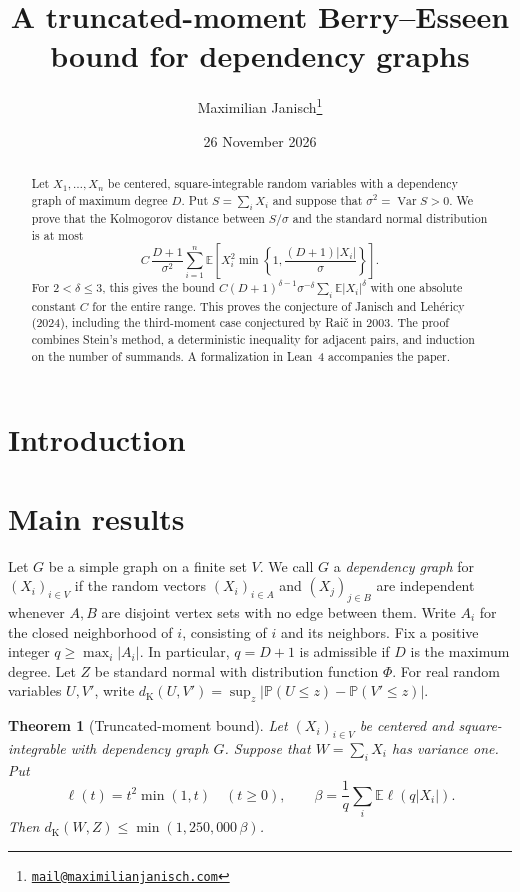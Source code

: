 \documentclass[11pt,a4paper]{article}
\title{A truncated-moment Berry--Esseen bound for dependency graphs}
\author{Maximilian Janisch\thanks{\href{mailto:mail@maximilianjanisch.com}{\nolinkurl{mail@maximilianjanisch.com}}}}
\date{26 November 2026}
\newtheorem{theorem}{Theorem}
\newcommand{\E}{\mathbb E}
\newcommand{\PP}{\mathbb P}
\newcommand{\Var}{\operatorname{Var}}
\newcommand{\dK}{d_{\mathrm K}}
\begin{document}
\maketitle

\begin{abstract}
Let $X_1,\ldots,X_n$ be centered, square-integrable random variables with
a dependency graph of maximum degree $D$. Put $S=\sum_i X_i$ and suppose
that $\sigma^2=\Var S>0$. We prove that the Kolmogorov distance between
$S/\sigma$ and the standard normal distribution is at most
\[
 C\,\frac{D+1}{\sigma^2}\sum_{i=1}^n
 \E\!\left[X_i^2\min\!\left\{1,\frac{(D+1)|X_i|}{\sigma}\right\}\right].
\]
For $2<\delta\le3$, this gives the bound
$C(D+1)^{\delta-1}\sigma^{-\delta}\sum_i\E|X_i|^\delta$ with one
absolute constant $C$ for the entire range. This proves the conjecture of
Janisch and Lehéricy (2024), including the third-moment case conjectured
by Raič in 2003. The proof combines Stein's method, a deterministic
inequality for adjacent pairs, and induction on the number of summands.
A formalization in Lean~4 accompanies the paper.
\end{abstract}

\section{Introduction}


\section{Main results}\label{sec:results}
Let $G$ be a simple graph on a finite set $V$. We call $G$ a
\emph{dependency graph} for $(X_i)_{i\in V}$ if the random vectors
$(X_i)_{i\in A}$ and $(X_j)_{j\in B}$ are independent whenever $A,B$
are disjoint vertex sets with no edge between them. Write $A_i$ for the
closed neighborhood of $i$, consisting of $i$ and its neighbors.
Fix a positive integer $q\ge\max_i|A_i|$. In particular, $q=D+1$ is
admissible if $D$ is the maximum degree. Let $Z$ be standard normal
with distribution function $\Phi$. For real random variables $U,V'$,
write $\dK(U,V')=\sup_z|\PP(U\le z)-\PP(V'\le z)|$.

\begin{theorem}[Truncated-moment bound]\label{thm:main}
Let $(X_i)_{i\in V}$ be centered and square-integrable with dependency
graph $G$. Suppose that $W=\sum_iX_i$ has variance one. Put
\begin{equation}\label{eq:ell}
 \ell(t)=t^2\min(1,t)\quad(t\ge0),\qquad
 \beta=\frac1q\sum_i\E\ell(q|X_i|).
\end{equation}
Then $\dK(W,Z)\le\min(1,250{,}000\,\beta)$.
\end{theorem}
\end{document}
